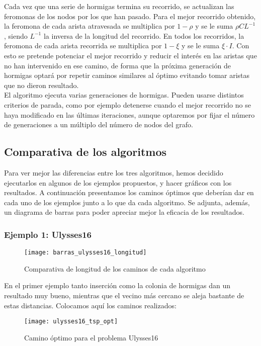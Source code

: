 Cada vez que una serie de hormigas termina su recorrido, se actualizan las feromonas de los nodos por los que han pasado. Para el mejor recorrido obtenido, la feromona de cada arista atravesada se multiplica por $1-\rho$ y se le suma $\rho C L^{-1}$, siendo $L^{-1}$ la inversa de la longitud del recorrido. En todos los recorridos, la feromona de cada arista recorrida se multiplica por $1-\xi$ y se le suma $\xi \cdot I$. Con esto se pretende potenciar el mejor recorrido y reducir el interés en las aristas que no han intervenido en ese camino, de forma que la próxima generación de hormigas optará por repetir caminos similares al óptimo evitando tomar aristas que no dieron resultado. \\

El algoritmo ejecuta varias generaciones de hormigas. Pueden usarse distintos criterios de parada, como por ejemplo detenerse cuando el mejor recorrido no se haya modificado en las últimas iteraciones, aunque optaremos por fijar el número de generaciones a un múltiplo del número de nodos del grafo.

\subsection{Comparativa de los algoritmos}

Para ver mejor las diferencias entre los tres algoritmos, hemos decidido ejecutarlos en algunos de los ejemplos propuestos, y hacer gráficos con los resultados. A continuación presentamos los caminos óptimos que deberían dar en cada uno de los ejemplos junto a lo que da cada algoritmo. Se adjunta, además, un diagrama de barras para poder apreciar mejor la eficacia de los resultados.

\subsubsection{Ejemplo 1: Ulysses16}


\begin{figure}[h]	\texttt{[image: barras\_ulysses16\_longitud]} \centering
	\caption{Comparativa de longitud de los caminos de cada algoritmo} \end{figure}


En el primer ejemplo tanto inserción como la colonia de hormigas dan un resultado muy bueno, mientras que el vecino más cercano se aleja bastante de estas distancias. Colocamos aquí los caminos realizados:

\begin{figure}[h]	\texttt{[image: ulysses16\_tsp\_opt]} \centering
	\caption{Camino óptimo para el problema Ulysses16} \end{figure}

